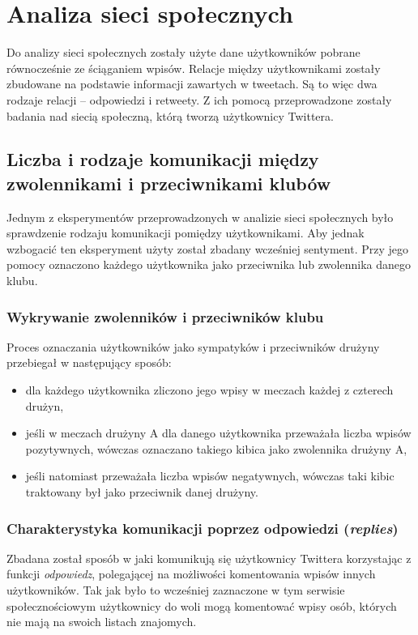 
\section{Analiza sieci społecznych}
\label{section:analizaspoleczna}
Do analizy sieci społecznych zostały użyte dane użytkowników pobrane 
równocześnie ze ściąganiem wpisów. Relacje między użytkownikami zostały
zbudowane na podstawie informacji zawartych w tweetach. Są to więc
dwa rodzaje relacji -- odpowiedzi i retweety. Z ich pomocą przeprowadzone
zostały badania nad siecią społeczną, którą tworzą użytkownicy Twittera. 






\subsection{Liczba i rodzaje komunikacji między zwolennikami i przeciwnikami klubów}

Jednym z eksperymentów przeprowadzonych w analizie sieci społecznych było
sprawdzenie rodzaju komunikacji pomiędzy użytkownikami. Aby jednak wzbogacić
ten eksperyment użyty został zbadany wcześniej sentyment. Przy jego pomocy
oznaczono każdego użytkownika jako przeciwnika lub zwolennika danego klubu.

\subsubsection{Wykrywanie zwolenników i przeciwników klubu}
Proces oznaczania użytkowników jako sympatyków i przeciwników drużyny przebiegał
w następujący sposób:
\begin{itemize}
  \item dla każdego użytkownika zliczono jego wpisy w meczach każdej z czterech 
  drużyn,
  \item jeśli w meczach drużyny A dla danego użytkownika przeważała liczba 
  wpisów pozytywnych, wówczas oznaczano takiego kibica jako zwolennika drużyny A,
  \item jeśli natomiast przeważała liczba wpisów negatywnych, wówczas taki kibic
  traktowany był jako przeciwnik danej drużyny.  
\end{itemize} 


\subsubsection{Charakterystyka komunikacji poprzez odpowiedzi (\textit{replies})}
Zbadana został sposób w jaki komunikują się użytkownicy Twittera korzystając
z funkcji \textit{odpowiedz}, polegającej na możliwości komentowania wpisów
innych użytkowników. Tak jak było to wcześniej zaznaczone w tym serwisie
społecznościowym użytkownicy do woli mogą komentować wpisy osób, których
nie mają na swoich listach znajomych.

